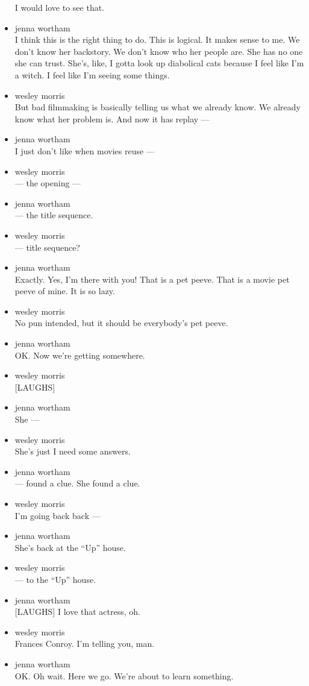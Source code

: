 \begin{itemize}
  I would love to see that.
\item
  jenna wortham\\
  I think this is the right thing to do. This is logical. It makes sense
  to me. We don't know her backstory. We don't know who her people are.
  She has no one she can trust. She's, like, I gotta look up diabolical
  cats because I feel like I'm a witch. I feel like I'm seeing some
  things.
\item
  wesley morris\\
  But bad filmmaking is basically telling us what we already know. We
  already know what her problem is. And now it has replay ---
\item
  jenna wortham\\
  I just don't like when movies reuse ---
\item
  wesley morris\\
  --- the opening ---
\item
  jenna wortham\\
  --- the title sequence.
\item
  wesley morris\\
  --- title sequence?
\item
  jenna wortham\\
  Exactly. Yes, I'm there with you! That is a pet peeve. That is a movie
  pet peeve of mine. It is so lazy.
\item
  wesley morris\\
  No pun intended, but it should be everybody's pet peeve.
\item
  jenna wortham\\
  OK. Now we're getting somewhere.
\item
  wesley morris\\
  {[}LAUGHS{]}
\item
  jenna wortham\\
  She ---
\item
  wesley morris\\
  She's just I need some answers.
\item
  jenna wortham\\
  --- found a clue. She found a clue.
\item
  wesley morris\\
  I'm going back back ---
\item
  jenna wortham\\
  She's back at the ``Up'' house.
\item
  wesley morris\\
  --- to the ``Up'' house.
\item
  jenna wortham\\
  {[}LAUGHS{]} I love that actress, oh.
\item
  wesley morris\\
  Frances Conroy. I'm telling you, man.
\item
  jenna wortham\\
  OK. Oh wait. Here we go. We're about to learn something.


\end{itemize}
